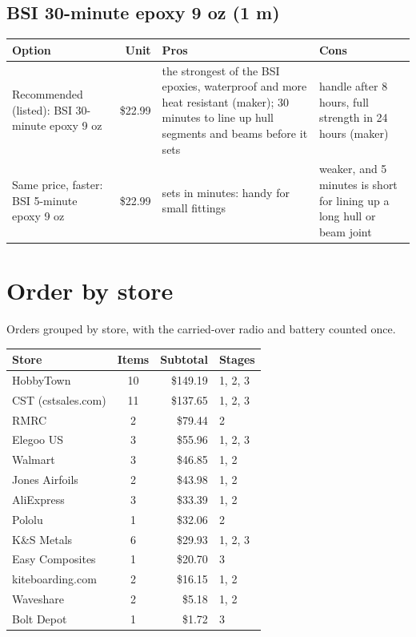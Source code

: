 \documentclass[11pt]{article}
\begin{document}
\subsection*{BSI 30-minute epoxy 9 oz \normalfont\small (1 m)}
{\small
\begin{longtable}{L{3.6cm}rL{5.4cm}L{5.4cm}}
\toprule
Option & Unit & Pros & Cons \\
\midrule
Recommended (listed): BSI 30-minute epoxy 9 oz & \$22.99 & the strongest of the BSI epoxies, waterproof and more heat resistant (maker); 30 minutes to line up hull segments and beams before it sets & handle after 8 hours, full strength in 24 hours (maker) \\
Same price, faster: BSI 5-minute epoxy 9 oz & \$22.99 & sets in minutes: handy for small fittings & weaker, and 5 minutes is short for lining up a long hull or beam joint \\
\bottomrule
\end{longtable}}

\clearpage
\section*{Order by store}
Orders grouped by store, with the carried-over radio and battery counted once.
\begin{center}
\begin{tabular}{lcrl}
\toprule
Store & Items & Subtotal & Stages \\
\midrule
HobbyTown & 10 & \$149.19 & 1, 2, 3 \\
CST (cstsales.com) & 11 & \$137.65 & 1, 2, 3 \\
RMRC & 2 & \$79.44 & 2 \\
Elegoo US & 3 & \$55.96 & 1, 2, 3 \\
Walmart & 3 & \$46.85 & 1, 2 \\
Jones Airfoils & 2 & \$43.98 & 1, 2 \\
AliExpress & 3 & \$33.39 & 1, 2 \\
Pololu & 1 & \$32.06 & 2 \\
K\&S Metals & 6 & \$29.93 & 1, 2, 3 \\
Easy Composites & 1 & \$20.70 & 3 \\
kiteboarding.com & 2 & \$16.15 & 1, 2 \\
Waveshare & 2 & \$5.18 & 1, 2 \\
Bolt Depot & 1 & \$1.72 & 3 \\
\bottomrule
\end{tabular}
\end{center}
\end{document}
